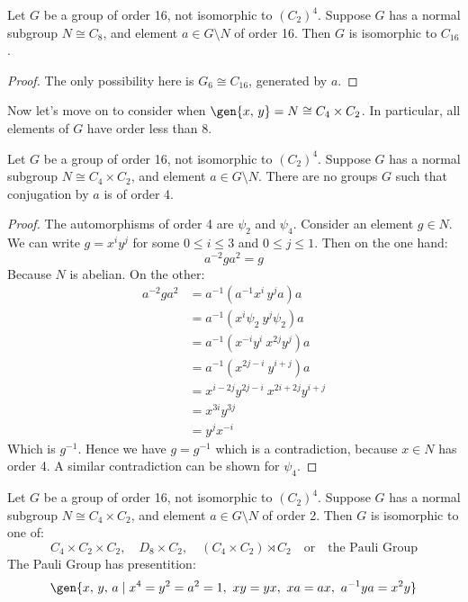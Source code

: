 \begin{lemma}
    Let \(G\) be a group of order 16, not isomorphic to \({(C_{2})}^4\).
    Suppose \(G\) has a normal subgroup \(N \cong C_8\), and element \(a \in G\setminus N\) of order 16.
    Then \(G\) is isomorphic to \(C_{16}\).
\end{lemma}

\begin{proof}
    The only possibility here is \(G_6 \cong C_{16}\), generated by \(a\).
\end{proof}


Now let's move on to consider when \(\gen{x,\,y} = N \cong C_4 \times C_2\).
In particular, all elements of \(G\) have order less than 8.

\begin{lemma}
    Let \(G\) be a group of order 16, not isomorphic to \({(C_{2})}^4\).
    Suppose \(G\) has a normal subgroup \(N \cong C_4 \times C_2\), and element \(a \in G\setminus N\).
    There are no groups \(G\) such that conjugation by \(a\) is of order 4.
\end{lemma}

\begin{proof}
    The automorphisms of order 4 are \(\psi_2\) and \(\psi_4\).
    Consider an element \(g \in N\).
    We can write \(g = x^i y^j\) for some \(0 \leqslant i \leqslant 3\) and \(0 \leqslant j \leqslant 1\).
    Then on the one hand:
    \[a^{-2}ga^2 = g\]
    Because \(N\) is abelian.
    On the other:
    \begin{align*}
        a^{-2}ga^2 &= a^{-1}(a^{-1}x^i\,y^j a)a \\
        &= a^{-1}(x^i\psi_2\ y^j\psi_2)a \\
        &= a^{-1}(x^{-i}y^i\ x^{2j}y^j)a \\
        &= a^{-1}(x^{2j-i}\ y^{i+j})a \\
        &= x^{i-2j}y^{2j-i}\ x^{2i+2j}y^{i+j} \\
        &= x^{3i}y^{3j} \\
        &= y^j x^{-i}
    \end{align*}
    Which is \(g^{-1}\).
    Hence we have \(g = g^{-1}\) which is a contradiction, because \(x \in N\) has order 4.
    A similar contradiction can be shown for \(\psi_4\).
\end{proof}

\begin{lemma}
    Let \(G\) be a group of order 16, not isomorphic to \({(C_{2})}^4\).
    Suppose \(G\) has a normal subgroup \(N \cong C_4 \times C_2\), and element \(a \in G\setminus N\) of order 2.
    Then \(G\) is isomorphic to one of:
    \[
        C_4 \times C_2 \times C_2, \quad%
        D_8 \times C_2, \quad%
        (C_4 \times C_2) \rtimes C_2 \quad \text{or} \quad%
        \text{the Pauli Group}
    \]
    The Pauli Group has presentition:
    \[
        \gen{x,\,y,\,a \mid x^4 = y^2 = a^2 = 1,\ xy = yx,\ xa = ax,\ a^{-1}ya = x^2 y}
    \]
\end{lemma}


